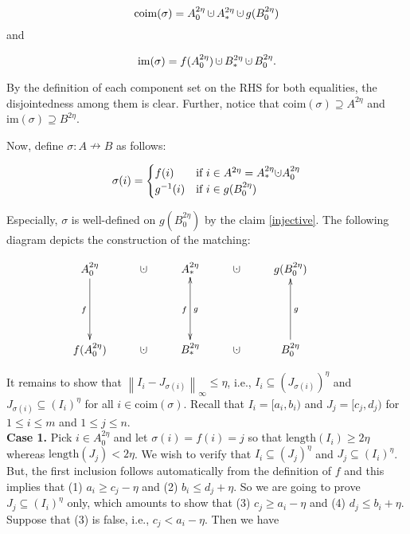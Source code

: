 \documentclass[a4paper,12pt]{article}
\newcommand{\dotcup}{\ensuremath{\mathaccent\cdot\cup}}
\newcommand{\length}[1]{\mathrm{length}(#1)}
\newcommand{\norm}[1]{\left\lVert#1\right\rVert}
\begin{document}
$$\mathrm{coim}(\sigma) = A^{2\eta}_0 \,\dotcup\, A^{2\eta}_\ast\,\dotcup \,g(B^{2\eta}_0)$$ and

$$\mathrm{im}(\sigma) = f(A^{2\eta}_0) \, \dotcup \, B^{2\eta}_\ast \,\dotcup \, B^{2\eta}_0.$$

By the definition of each component set on the RHS for both equalities, the disjointedness among them is clear. Further, notice that 
$\mathrm{coim}(\sigma)\supseteq A^{2\eta}$ and $\mathrm{im}(\sigma)\supseteq B^{2\eta}$.

Now, define $\sigma: A \nrightarrow B$ as follows:

$$\sigma(i)=\begin{cases} f(i)& \mbox{if $i\in A^{2\eta}=A^{2\eta}_*\dotcup A^{2\eta}_0$}\\ g^{-1}(i)& \mbox{if $i \in g(B_{0}^{2\eta})$}
\end{cases}$$

Especially, $\sigma$ is well-defined on $g(B_{0}^{2\eta})$ by the claim \ref{injective}. The following diagram depicts the construction of the matching:


$$
\xymatrix{
A^{2\eta}_0 \ar[dd]_f & \dotcup &  A^{2\eta}_\ast\ar@{<->}[dd]_{f}^{g} & \dotcup & g(B^{2\eta}_0)\\
& & & & & \\
f(A^{2\eta}_0) & \dotcup & B^{2\eta}_\ast & \dotcup & B^{2\eta}_0\ar[uu]_g
}
$$

It remains to show that  $\norm{I_i-J_{\sigma(i)}}_{\infty}\leq \eta$, i.e., $I_i \subseteq (J_{\sigma(i)})^{\eta}$ and $J_{\sigma(i)}\subseteq (I_i)^{\eta}$ for all $i\in \mathrm{coim}(\sigma)$. Recall that $I_i=[a_i,b_i)$ and $J_j=[c_j,d_j)$ for $1\leq i \leq m$ and $1\leq j \leq n$. \\

\noindent\textbf{Case 1.} Pick $i\in A^{2\eta}_0$ and let $\sigma(i)=f(i)=j$ so that $\length{I_i}\geq 2\eta$ whereas $\length{J_{j}}< 2\eta$. We wish to verify that $I_i \subseteq (J_j)^{\eta}$ and $J_j\subseteq (I_i)^{\eta}$. But, the first inclusion follows automatically from the definition of $f$ and this implies that (1) $a_i\geq c_j-\eta$ and (2) $b_i\leq d_j+\eta$. So we are going to prove $J_j\subseteq (I_i)^{\eta}$ only, which amounts to show that (3) $c_j\geq a_i-\eta$ and (4) $d_j\leq b_i+\eta$. Suppose that (3) is false, i.e., $c_j<a_i-\eta$. Then we have
\end{document}
